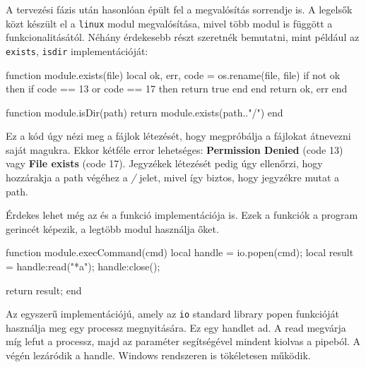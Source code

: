 

A tervezési fázis után hasonlóan épült fel a megvalósítás sorrendje is. A legelsők közt készült el a \texttt{linux} modul megvalósítása, mivel több modul is függött a funkcionalitásától. Néhány érdekesebb részt szeretnék bemutatni, mint például az \texttt{exists}, \texttt{isdir} implementációját:

\begin{lua}
function module.exists(file)
    local ok, err, code = os.rename(file, file)
    if not ok then
        if code == 13 or code == 17 then
            return true
        end
    end
    return ok, err
end
 
function module.isDir(path)
    return module.exists(path.."/")
end
\end{lua}

Ez a kód úgy nézi meg a fájlok létezését, hogy megpróbálja a fájlokat átnevezni saját magukra. Ekkor kétféle error lehetséges: \textbf{Permission Denied} (code 13) vagy \textbf{File exists} (code 17). Jegyzékek létezését pedig úgy ellenőrzi, hogy hozzárakja a path végéhez a \textit{/} jelet, mivel így biztos, hogy jegyzékre mutat a path.

Érdekes lehet még az \texttt{} és a \texttt{} funkció implementációja is. Ezek a funkciók a program gerincét képezik, a legtöbb modul használja őket.

\begin{lua}
function module.execCommand(cmd)
    local handle = io.popen(cmd);
    local result = handle:read("*a");
    handle:close();

    return result;
end
\end{lua}

\pagebreak
Az \texttt{} egyszerű implementációjú, amely az \texttt{io} standard library popen funkcióját használja meg egy processz megnyitására. Ez egy handlet ad. A read megvárja míg lefut a processz, majd az \texttt{} paraméter segítségével mindent kiolvas a pipeból. A végén lezáródik a handle. Windows rendszeren is tökéletesen működik.

